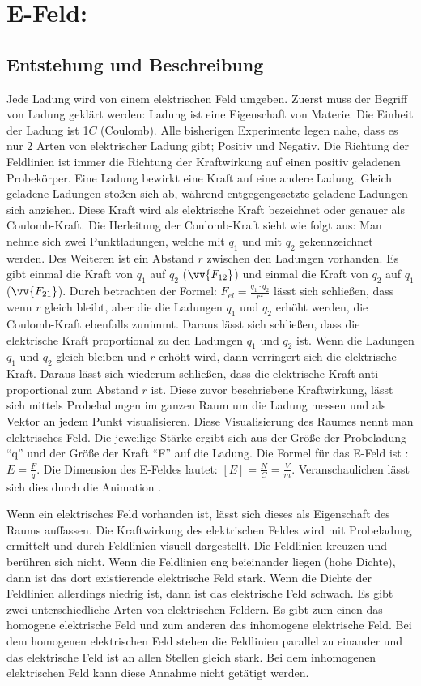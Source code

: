 \section{E-Feld:}
\subsection{Entstehung und Beschreibung}
Jede Ladung wird von einem elektrischen Feld umgeben.
Zuerst muss der Begriff von Ladung geklärt werden:
Ladung ist eine Eigenschaft von Materie.
Die Einheit der Ladung ist 1$C$ (Coulomb).
Alle bisherigen Experimente legen nahe, dass es nur 2 Arten von elektrischer Ladung gibt; Positiv und Negativ.
Die Richtung der Feldlinien ist immer die Richtung der Kraftwirkung auf einen positiv geladenen Probekörper.
Eine Ladung bewirkt eine Kraft auf eine andere Ladung.
Gleich geladene Ladungen stoßen sich ab, während entgegengesetzte geladene Ladungen sich anziehen.
Diese Kraft wird als elektrische Kraft bezeichnet oder genauer als Coulomb-Kraft.
Die Herleitung der Coulomb-Kraft sieht wie folgt aus:
Man nehme sich zwei Punktladungen, welche mit $q_1$ und mit $q_2$ gekennzeichnet werden. 
Des Weiteren ist ein Abstand $r$ zwischen den Ladungen vorhanden.
Es gibt einmal die Kraft von $q_1$ auf $q_2$ ($\vv{F_{12}}$) und einmal die Kraft von $q_2$ auf $q_1$ ($\vv{F_{21}}$).
Durch betrachten der Formel: $F_{el} = \frac{q_1 \cdot q_2}{r^2}$ 
lässt sich schließen, dass wenn $r$ gleich bleibt, aber die die Ladungen $q_1$ und $q_2$ erhöht werden, die Coulomb-Kraft ebenfalls zunimmt.
Daraus lässt sich schließen, dass die elektrische Kraft proportional zu den Ladungen $q_1$ und $q_2$ ist. 
Wenn die Ladungen $q_1$ und $q_2$ gleich bleiben und $r$ erhöht wird, dann verringert sich die elektrische Kraft.
Daraus lässt sich wiederum schließen, dass die elektrische Kraft anti proportional zum Abstand $r$ ist.
Diese zuvor beschriebene Kraftwirkung, lässt sich mittels Probeladungen im ganzen Raum um die Ladung messen und als Vektor an jedem Punkt visualisieren.
Diese Visualisierung des Raumes nennt man elektrisches Feld.
Die jeweilige Stärke ergibt sich aus der Größe der Probeladung "`q"' und der Größe der Kraft "`F"' auf die Ladung.
Die Formel für das E-Feld ist : $E = \frac{F}{q}$.
Die Dimension des E-Feldes lautet: $[E] = \frac{N}{C} = \frac{V}{m}$.
Veranschaulichen lässt sich dies durch die Animation \cite{Animation}.

Wenn ein elektrisches Feld vorhanden ist, lässt sich dieses als Eigenschaft des Raums auffassen.
Die Kraftwirkung des elektrischen Feldes wird mit Probeladung ermittelt und durch Feldlinien visuell dargestellt.
Die Feldlinien kreuzen und berühren sich nicht.
Wenn die Feldlinien eng beieinander liegen (hohe Dichte), dann ist das dort existierende elektrische Feld stark.
Wenn die Dichte der Feldlinien allerdings niedrig ist, dann ist das elektrische Feld schwach.
Es gibt zwei unterschiedliche Arten von elektrischen Feldern. 
Es gibt zum einen das homogene elektrische Feld und zum anderen das inhomogene elektrische Feld.
Bei dem homogenen elektrischen Feld stehen die Feldlinien parallel zu einander und das elektrische Feld ist an allen Stellen gleich stark.
Bei dem inhomogenen elektrischen Feld kann diese Annahme nicht getätigt werden.
